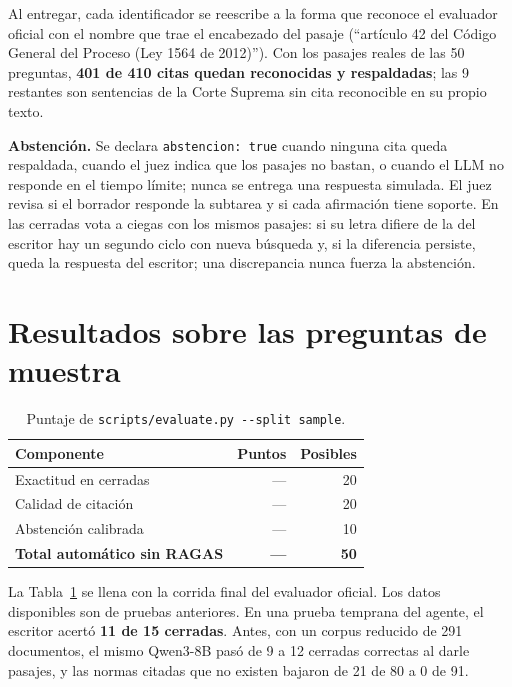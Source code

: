 \documentclass[10pt,twocolumn,letterpaper]{article}
\newcommand{\cod}[1]{\texttt{#1}}
\newcommand{\pend}{---}
\begin{document}
Al entregar, cada identificador se reescribe a la forma que reconoce el evaluador
oficial con el nombre que trae el encabezado del pasaje (``artículo 42 del Código
General del Proceso (Ley 1564 de 2012)''). Con los pasajes reales de las 50 preguntas,
\textbf{401 de 410 citas quedan reconocidas y respaldadas}; las 9 restantes son
sentencias de la Corte Suprema sin cita reconocible en su propio texto.

\textbf{Abstención.} Se declara \cod{abstencion: true} cuando ninguna cita queda
respaldada, cuando el juez indica que los pasajes no bastan, o cuando el LLM no responde
en el tiempo límite; nunca se entrega una respuesta simulada. El juez revisa si el
borrador responde la subtarea y si cada afirmación tiene soporte. En las cerradas vota a
ciegas con los mismos pasajes: si su letra difiere de la del escritor hay un segundo
ciclo con nueva búsqueda y, si la diferencia persiste, queda la respuesta del escritor;
una discrepancia nunca fuerza la abstención.

\section{Resultados sobre las preguntas de muestra}

\begin{table}[!ht]
\centering\footnotesize
\caption{Puntaje de \cod{scripts/evaluate.py -{}-split sample}.}
\label{tab:resultados}
\begin{tabular}{@{}lrr@{}}
\toprule
Componente & Puntos & Posibles \\
\midrule
Exactitud en cerradas   & \pend & 20 \\ %
Calidad de citación     & \pend & 20 \\ %
Abstención calibrada    & \pend & 10 \\ %
\midrule
\textbf{Total automático sin RAGAS} & \textbf{\pend} & \textbf{50} \\ %
\bottomrule
\end{tabular}
\end{table}

La Tabla~\ref{tab:resultados} se llena con la corrida final del evaluador oficial. Los
datos disponibles son de pruebas anteriores. En una prueba temprana del agente, el
escritor acertó \textbf{11 de 15 cerradas}. Antes, con un corpus reducido de 291
documentos, el mismo Qwen3-8B pasó de 9 a 12 cerradas correctas al darle pasajes, y las
normas citadas que no existen bajaron de 21 de 80 a 0 de 91.
\end{document}
